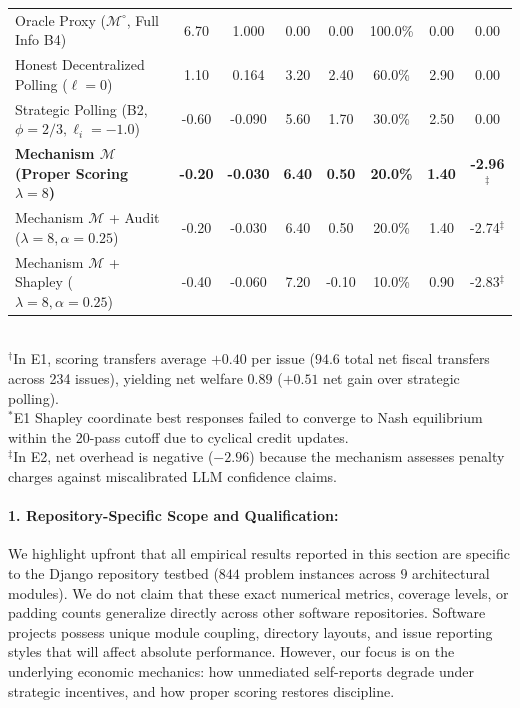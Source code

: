 \documentclass{article}
\theoremstyle{definition}
\begin{document}
\begin{table}[!htbp]
{\begin{tabular}{lccccccc}
Oracle Proxy ($\mathcal{M}^\circ$, Full Info B4) & 6.70 & 1.000 & 0.00 & 0.00 & 100.0\% & 0.00 & 0.00 \\
Honest Decentralized Polling ($\ell = 0$) & 1.10 & 0.164 & 3.20 & 2.40 & 60.0\% & 2.90 & 0.00 \\
Strategic Polling (B2, $\phi=2/3, \ell_i=-1.0$) & -0.60 & -0.090 & 5.60 & 1.70 & 30.0\% & 2.50 & 0.00 \\
\textbf{Mechanism $\mathcal{M}$ (Proper Scoring $\lambda=8$)} & \textbf{-0.20} & \textbf{-0.030} & \textbf{6.40} & \textbf{0.50} & \textbf{20.0\%} & \textbf{1.40} & \textbf{-2.96}$^\ddagger$ \\
Mechanism $\mathcal{M}$ + Audit ($\lambda=8, \alpha=0.25$) & -0.20 & -0.030 & 6.40 & 0.50 & 20.0\% & 1.40 & -2.74$^\ddagger$ \\
Mechanism $\mathcal{M}$ + Shapley ($\lambda=8, \alpha=0.25$) & -0.40 & -0.060 & 7.20 & -0.10 & 10.0\% & 0.90 & -2.83$^\ddagger$ \\
\bottomrule
\end{tabular}%
}
\vspace{1mm}
\footnotesize \\
$^\dagger$In E1, scoring transfers average $+0.40$ per issue ($94.6$ total net fiscal transfers across 234 issues), yielding net welfare $0.89$ ($+0.51$ net gain over strategic polling). \\
$^*$E1 Shapley coordinate best responses failed to converge to Nash equilibrium within the 20-pass cutoff due to cyclical credit updates. \\
$^\ddagger$In E2, net overhead is negative ($-2.96$) because the mechanism assesses penalty charges against miscalibrated LLM confidence claims.
\end{table}

\paragraph{1. Repository-Specific Scope and Qualification:}
We highlight upfront that all empirical results reported in this section are specific to the Django repository testbed ($844$ problem instances across $9$ architectural modules). We do not claim that these exact numerical metrics, coverage levels, or padding counts generalize directly across other software repositories. Software projects possess unique module coupling, directory layouts, and issue reporting styles that will affect absolute performance. However, our focus is on the underlying economic mechanics: how unmediated self-reports degrade under strategic incentives, and how proper scoring restores discipline.
\end{document}
